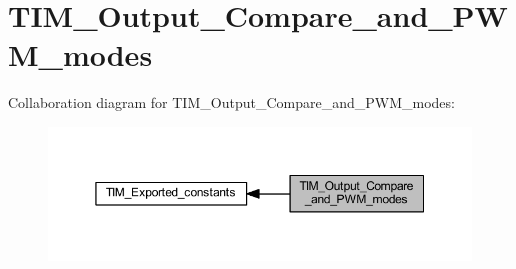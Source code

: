 \hypertarget{group___t_i_m___output___compare__and___p_w_m__modes}{}\section{T\+I\+M\+\_\+\+Output\+\_\+\+Compare\+\_\+and\+\_\+\+P\+W\+M\+\_\+modes}
\label{group___t_i_m___output___compare__and___p_w_m__modes}
Collaboration diagram for T\+I\+M\+\_\+\+Output\+\_\+\+Compare\+\_\+and\+\_\+\+P\+W\+M\+\_\+modes\+:
\nopagebreak
\begin{figure}[H]
\begin{center}
\leavevmode
\includegraphics[width=350pt]{group___t_i_m___output___compare__and___p_w_m__modes}
\end{center}
\end{figure}
